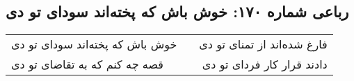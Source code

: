 \begin{center}
\section*{رباعی شماره ۱۷۰: خوش باش که پخته‌اند سودای تو دی}
\label{sec:sh170}
\begin{longtable}{l p{0.5cm} r}
خوش باش که پخته‌اند سودای تو دی
&&
فارغ شده‌اند از تمنای تو دی
\\
قصه چه کنم که به تقاضای تو دی
&&
دادند قرار کار فردای تو دی
\\
\end{longtable}
\end{center}
